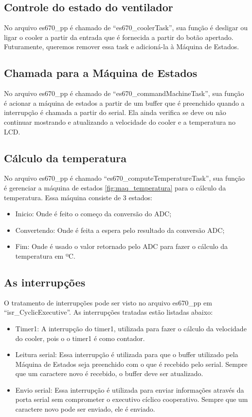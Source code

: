 \documentclass{article}
\begin{document}
\subsection{Controle do estado do ventilador}
No arquivo es670\_pp é chamado de ``es670\_coolerTask'', sua função é desligar ou ligar o cooler a partir da entrada que é fornecida a partir do botão apertado.
Futuramente, queremos remover essa task e adicioná-la à Máquina de Estados.

\subsection{Chamada para a Máquina de Estados}
No arquivo es670\_pp é chamado de ``es670\_commandMachineTask'', sua função é acionar a máquina de estados a partir de um buffer que é preenchido quando a interrupção é chamada a partir do serial. Ela ainda verifica se deve ou não continuar mostrando e atualizando a velocidade do cooler e a temperatura no LCD.

\subsection{Cálculo da temperatura}
No arquivo es670\_pp é chamado ``es670\_computeTemperatureTask'', sua função é gerenciar a máquina de estados \ref{fig:maq_temperatura} para o cálculo da temperatura.
Essa máquina consiste de 3 estados:
\begin{itemize}
\item Inicio: Onde é feito o começo da conversão do ADC;
\item Convertendo: Onde é feita a espera pelo resultado da conversão ADC;
\item Fim: Onde é usado o valor retornado pelo ADC para fazer o cálculo da temperatura em ºC.
\end{itemize}

\subsection{As interrupções}
O tratamento de interrupções pode ser visto no arquivo es670\_pp em ``isr\_CyclicExecutive''. As interrupções tratadas estão listadas abaixo:
\begin{itemize}
\item Timer1: A interrupção do timer1, utilizada para fazer o cálculo da velocidade do cooler, pois o o timer1 é como contador.
\item Leitura serial: Essa interrupção é utilizada para que o buffer utilizado pela Máquina de Estados seja preenchido com o que é recebido pelo serial. Sempre que um caractere novo é recebido, o buffer deve ser atualizado.
\item Envio serial: Essa interrupção é utilizada para enviar informações através da porta serial sem comprometer o executivo cíclico cooperativo. Sempre que um caractere novo pode ser enviado, ele é enviado.
\end{itemize}
\end{document}
